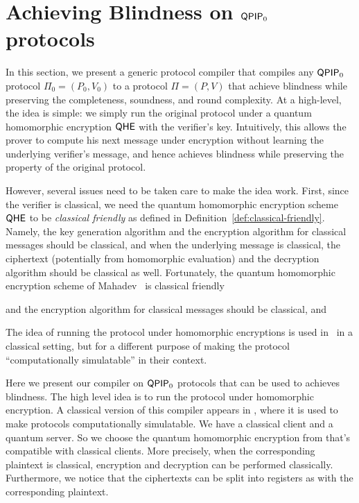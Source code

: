 \section{Achieving Blindness on $\operatorname{\mathsf{QPIP}}_0$ protocols}
\label{sec:BlindBQP2}

In this section, we present a generic protocol compiler that compiles any $\operatorname{\mathsf{QPIP}}_0$ protocol $\Pi_0 = (P_0,V_0)$ to a protocol $\Pi = (P,V)$ that achieve blindness while preserving the completeness, soundness, and round complexity. At a high-level, the idea is simple: we simply run the original protocol under a quantum homomorphic encryption $\mathsf{QHE}$ with the verifier's key. Intuitively, this allows the prover to compute his next message under encryption without learning the underlying verifier's message, and hence achieves blindness while preserving the property of the original protocol. 

However, several issues need to be taken care to make the idea work. First, since the verifier is classical, we need the quantum homomorphic encryption scheme $\mathsf{QHE}$ to be \emph{classical friendly} as defined in Definition~\ref{def:classical-friendly}. Namely, the key generation algorithm and the encryption algorithm for classical messages should be classical, and when the underlying message is classical, the ciphertext (potentially from homomorphic evaluation) and the decryption algorithm should be classical as well. Fortunately, the quantum homomorphic encryption scheme of Mahadev~\cite{mahadev_qfhe} is classical friendly

and the encryption algorithm for classical messages should be classical, and 


The idea of running the protocol under homomorphic encryptions is used in~\cite{KMThesis} in a classical setting, but for a different purpose of making the protocol ``computationally simulatable'' in their context.  

Here we present our compiler on $\operatorname{\mathsf{QPIP}}_0$ protocols that can be used to achieves blindness.
The high level idea is to run the protocol under homomorphic encryption.
A classical version of this compiler appears in \cite{KMThesis}, where it is used to make protocols computationally simulatable.
We have a classical client and a quantum server.
So we choose the quantum homomorphic encryption from \cite{mahadev_qfhe} that's compatible with classical clients.
More precisely, when the corresponding plaintext is classical, encryption and decryption can be performed classically.
Furthermore, we notice that the ciphertexts can be split into registers as with the corresponding plaintext.

